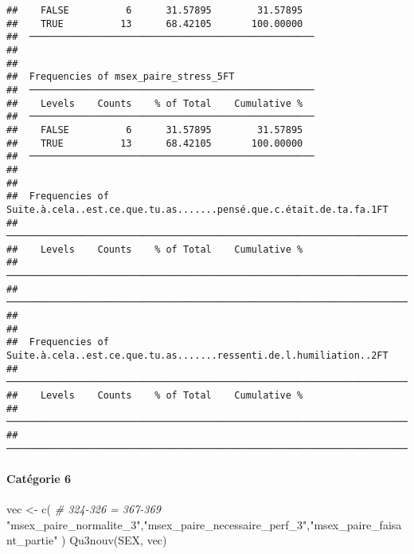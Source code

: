 \documentclass[
]{article}
\newenvironment{Shaded}{\begin{snugshade}}{\end{snugshade}}
\newcommand{\CommentTok}[1]{\textcolor[rgb]{0.56,0.35,0.01}{\textit{#1}}}
\newcommand{\FunctionTok}[1]{\textcolor[rgb]{0.00,0.00,0.00}{#1}}
\newcommand{\NormalTok}[1]{#1}
\newcommand{\OtherTok}[1]{\textcolor[rgb]{0.56,0.35,0.01}{#1}}
\newcommand{\StringTok}[1]{\textcolor[rgb]{0.31,0.60,0.02}{#1}}
\begin{document}
\begin{verbatim}
##    FALSE          6      31.57895        31.57895   
##    TRUE          13      68.42105       100.00000   
##  ────────────────────────────────────────────────── 
## 
## 
##  Frequencies of msex_paire_stress_5FT               
##  ────────────────────────────────────────────────── 
##    Levels    Counts    % of Total    Cumulative %   
##  ────────────────────────────────────────────────── 
##    FALSE          6      31.57895        31.57895   
##    TRUE          13      68.42105       100.00000   
##  ────────────────────────────────────────────────── 
## 
## 
##  Frequencies of Suite.à.cela..est.ce.que.tu.as.......pensé.que.c.était.de.ta.fa.1FT 
##  ────────────────────────────────────────────────────────────────────────────────── 
##    Levels    Counts    % of Total    Cumulative %   
##  ────────────────────────────────────────────────────────────────────────────────── 
##  ────────────────────────────────────────────────────────────────────────────────── 
## 
## 
##  Frequencies of Suite.à.cela..est.ce.que.tu.as.......ressenti.de.l.humiliation..2FT 
##  ────────────────────────────────────────────────────────────────────────────────── 
##    Levels    Counts    % of Total    Cumulative %   
##  ────────────────────────────────────────────────────────────────────────────────── 
##  ──────────────────────────────────────────────────────────────────────────────────
\end{verbatim}

\hypertarget{catuxe9gorie-6}{%
\paragraph{Catégorie 6}\label{catuxe9gorie-6}}

\begin{Shaded}
\begin{Highlighting}[]
\NormalTok{vec }\OtherTok{\textless{}{-}} \FunctionTok{c}\NormalTok{(  }\CommentTok{\# 324{-}326 = 367{-}369}
  \StringTok{"msex\_paire\_normalite\_3"}\NormalTok{,}\StringTok{"msex\_paire\_necessaire\_perf\_3"}\NormalTok{,}\StringTok{"msex\_paire\_faisant\_partie"}
\NormalTok{)}
\FunctionTok{Qu3nouv}\NormalTok{(SEX, vec)}
\end{Highlighting}
\end{Shaded}
\end{document}
